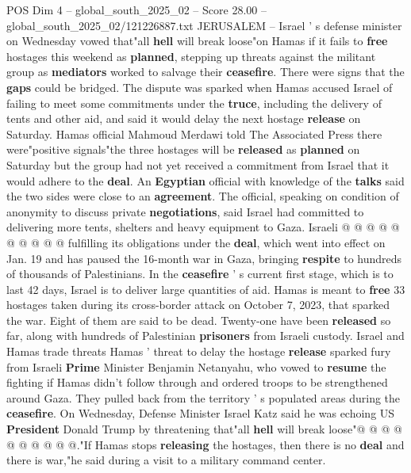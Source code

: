 \begin{textsample}{POS Dim 4 – global\_south\_2025\_02 – Score 28.00 – global\_south\_2025\_02/121226887.txt}  \label{ex:f4_pos_026}
JERUSALEM -- Israel ' s defense minister on Wednesday vowed that"all \textbf{hell} will break loose"on Hamas if it fails to \textbf{free} hostages this weekend as \textbf{planned}, stepping up threats against the militant group as \textbf{mediators} worked to salvage their \textbf{ceasefire}.
There were signs that the \textbf{gaps} could be bridged.
The dispute was sparked when Hamas accused Israel of failing to meet some commitments under the \textbf{truce}, including the delivery of tents and other aid, and said it would delay the next hostage \textbf{release} on Saturday.
Hamas official Mahmoud Merdawi told The Associated Press there were"positive signals"the three hostages will be \textbf{released} as \textbf{planned} on Saturday but the group had not yet received a commitment from Israel that it would adhere to the \textbf{deal}.
An \textbf{Egyptian} official with knowledge of the \textbf{talks} said the two sides were close to an \textbf{agreement}.
The official, speaking on condition of anonymity to discuss private \textbf{negotiations}, said Israel had committed to delivering more tents, shelters and heavy equipment to Gaza.
Israeli @ @ @ @ @ @ @ @ @ @ fulfilling its obligations under the \textbf{deal}, which went into effect on Jan. 19 and has paused the 16-month war in Gaza, bringing \textbf{respite} to hundreds of thousands of Palestinians.
In the \textbf{ceasefire} ' s current first stage, which is to last 42 days, Israel is to deliver large quantities of aid.
Hamas is meant to \textbf{free} 33 hostages taken during its cross-border attack on October 7, 2023, that sparked the war.
Eight of them are said to be dead.
Twenty-one have been \textbf{released} so far, along with hundreds of Palestinian \textbf{prisoners} from Israeli custody.
Israel and Hamas trade threats Hamas ' threat to delay the hostage \textbf{release} sparked fury from Israeli \textbf{Prime} Minister Benjamin Netanyahu, who vowed to \textbf{resume} the fighting if Hamas didn't follow through and ordered troops to be strengthened around Gaza.
They pulled back from the territory ' s populated areas during the \textbf{ceasefire}.
On Wednesday, Defense Minister Israel Katz said he was echoing US \textbf{President} Donald Trump by threatening that"all \textbf{hell} will break loose"@ @ @ @ @ @ @ @ @ @."If Hamas stops \textbf{releasing} the hostages, then there is no \textbf{deal} and there is war,"he said during a visit to a military command center.

\end{textsample}
